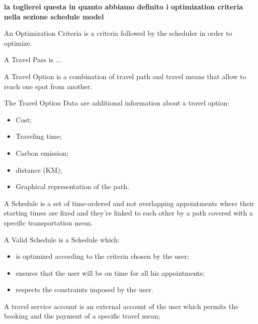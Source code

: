 \textbf{la toglierei questa in quanto abbiamo definito i optimization criteria nella sezione schedule model}
\begin{definition}
An Optimization Criteria is a criteria followed by the scheduler in order to optimize.
\end{definition}

\begin{definition}
A Travel Pass is  ...
\end{definition}

\begin{definition}
A Travel Option is a combination of travel path and travel means that allow to reach one spot from another.
\end{definition}

\begin{definition}
The Travel Option Data are additional information about a travel option:
\begin{itemize}
\item Cost;
\item Traveling time;
\item Carbon emission;
\item distance (KM);
\item Graphical representation of the path.

\end{itemize}
\end{definition}

\begin{definition}
A Schedule is a set of time-ordered and not overlapping appointments where their starting times are fixed and they're linked to each other by a path covered with a specific transportation mean.
\end{definition}

\begin{definition}
A Valid Schedule is a Schedule which:
\begin{itemize}
\item is optimized according to the criteria chosen by the user;
\item ensures that the user will be on time for all his appointments;
\item respects the constraints imposed by the user.
\end{itemize}
\end{definition}

\begin{definition}
A travel service account is an external account of the user which permits the booking and the payment of a specific travel mean;
\end{definition}

